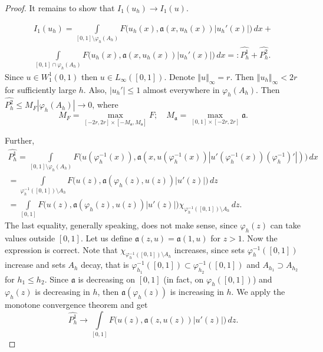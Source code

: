 \documentclass[12pt]{article}
\newcommand{\norm}[1]{\left\Vert#1\right\Vert}
\newcommand{\abs}[1]{\left\vert#1\right\vert}
\renewcommand{\phi}{\varphi}
\renewcommand{\le}{\leqslant}
\newcommand{\W}{W_1^1}
\begin{document}
\begin{proof}
It remains to show that $I_1( u_h ) \to I_1( u )$.

\begin{multline*}
I_1( u_h ) = \int\limits_{[0, 1] \setminus \phi_h( A_h )} F\big( u_h( x ), \mathfrak a( x, u_h(x) ) |u_h'( x )| \big) \, dx +\\
\int\limits_{[0, 1] \cap \phi_h( A_h )} F\big( u_h( x ), \mathfrak a( x, u_h(x) ) |u_h'( x )| \big) \, dx =: \hat{P_h^1} + \hat{P_h^2}.
\end{multline*}
Since $u \in \W(0, 1)$ then $u \in L_\infty( [0, 1] )$.
Denote $\norm{u}_\infty = r$.
Then $\norm{u_h}_\infty < 2r$ for sufficiently large $h$.
Also, $\abs{u_h'} \le 1$ almost everywhere in $\phi_h( A_h )$.
Then $\hat{P_h^2} \le M_F \abs{\phi_h( A_h )} \to 0$, where
$$M_F = \max\limits_{[-2r, 2r] \times [-M_{\mathfrak a}, M_{\mathfrak a}]} F;\quad M_{\mathfrak a} = \max\limits_{[0, 1] \times [-2r, 2r]} \mathfrak a.$$

Further,
\begin{multline*}
\hat{P_h^1} = \int\limits_{ [0, 1] \setminus \phi_h( A_h ) }
	F\big( u( \phi_h^{-1}( x ) ), \mathfrak a( x, u( \phi_h^{-1}( x ) ) |u'( \phi_h^{-1}( x ) ) ( \phi_h^{-1} )'| ) \big) \, dx
\\ =\int\limits_{ \phi_h^{-1}( [0, 1] ) \setminus A_h } F\big( u( z ), \mathfrak a( \phi_h( z ), u( z ) ) |u'( z )| \big) \, dz
\\ = \int\limits_{ [0, 1] } F\big( u( z ), \mathfrak a( \phi_h( z ), u( z ) ) |u'( z )| \big) \chi_{ \phi_h^{-1}( [0, 1] ) \setminus A_h } \, dz.
\end{multline*}
The last equality, generally speaking, does not make sense, since $\phi_h( z )$ can take values outside $[0, 1]$.
Let us define $\mathfrak a( z, u ) = \mathfrak a( 1, u )$ for $z > 1$. Now the expression is correct.
Note that $\chi_{\phi_h^{-1}( [0, 1] ) \setminus A_h}$ increases,
since sets $\phi_h^{-1}( [0, 1] )$ increase and sets $A_h$ decay,
that is $\phi_{h_1}^{-1}( [0, 1] ) \subset \phi_{h_2}^{-1}( [0, 1] )$ and $A_{h_1} \supset A_{h_2}$ for $h_1 \le h_2$.
Since $\mathfrak a$ is decreasing on $[0, 1]$ (in fact, on $\phi_h( [0, 1] )$) and $\phi_h( z )$ is decreasing in $h$,
then $\mathfrak a( \phi_h( z ) )$ is increasing in $h$.
We apply the monotone convergence theorem and get
$$\hat{P_h^1} \to \int\limits_{[0, 1]} F\big( u( z ), \mathfrak a( z, u( z ) ) |u'( z )| \big) \, dz.$$

\end{proof}
\end{document}
